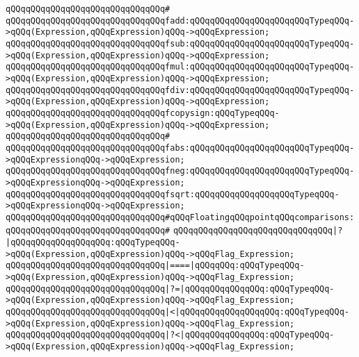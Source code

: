 \verb|qQQqqQQqqQQqqQQqqQQqqQQqqQQqqQQq#|\newline
\verb|qQQqqQQqqQQqqQQqqQQqqQQqqQQqqQQqfadd:qQQqqQQqqQQqqQQqqQQqqQQqTypeqQQq->qQQq(Expression,qQQqExpression)qQQq->qQQqExpression;|\newline
\verb|qQQqqQQqqQQqqQQqqQQqqQQqqQQqqQQqfsub:qQQqqQQqqQQqqQQqqQQqqQQqTypeqQQq->qQQq(Expression,qQQqExpression)qQQq->qQQqExpression;|\newline
\verb|qQQqqQQqqQQqqQQqqQQqqQQqqQQqqQQqfmul:qQQqqQQqqQQqqQQqqQQqqQQqTypeqQQq->qQQq(Expression,qQQqExpression)qQQq->qQQqExpression;|\newline
\verb|qQQqqQQqqQQqqQQqqQQqqQQqqQQqqQQqfdiv:qQQqqQQqqQQqqQQqqQQqqQQqTypeqQQq->qQQq(Expression,qQQqExpression)qQQq->qQQqExpression;|\newline
\verb|qQQqqQQqqQQqqQQqqQQqqQQqqQQqqQQqfcopysign:qQQqTypeqQQq->qQQq(Expression,qQQqExpression)qQQq->qQQqExpression;|\newline
\verb|qQQqqQQqqQQqqQQqqQQqqQQqqQQqqQQq#|\newline
\verb|qQQqqQQqqQQqqQQqqQQqqQQqqQQqqQQqfabs:qQQqqQQqqQQqqQQqqQQqqQQqTypeqQQq->qQQqExpressionqQQq->qQQqExpression;|\newline
\verb|qQQqqQQqqQQqqQQqqQQqqQQqqQQqqQQqfneg:qQQqqQQqqQQqqQQqqQQqqQQqTypeqQQq->qQQqExpressionqQQq->qQQqExpression;|\newline
\verb|qQQqqQQqqQQqqQQqqQQqqQQqqQQqqQQqfsqrt:qQQqqQQqqQQqqQQqqQQqTypeqQQq->qQQqExpressionqQQq->qQQqExpression;|\newline
\newline
\verb|qQQqqQQqqQQqqQQqqQQqqQQqqQQqqQQq#qQQqFloatingqQQqpointqQQqcomparisons:|\newline
\verb|qQQqqQQqqQQqqQQqqQQqqQQqqQQqqQQq#|\newline
\verb|qQQqqQQqqQQqqQQqqQQqqQQqqQQqqQQq|\verb#|?|qQQqqQQqqQQqqQQqqQQq:qQQqTypeqQQq->qQQq(Expression,qQQqExpression)qQQq->qQQqFlag_Expression;#\newline
\verb|qQQqqQQqqQQqqQQqqQQqqQQqqQQqqQQq|\verb#|====|qQQqqQQq:qQQqTypeqQQq->qQQq(Expression,qQQqExpression)qQQq->qQQqFlag_Expression;#\newline
\verb|qQQqqQQqqQQqqQQqqQQqqQQqqQQqqQQq|\verb#|?=|qQQqqQQqqQQqqQQq:qQQqTypeqQQq->qQQq(Expression,qQQqExpression)qQQq->qQQqFlag_Expression;#\newline
\verb|qQQqqQQqqQQqqQQqqQQqqQQqqQQqqQQq|\verb#|<|qQQqqQQqqQQqqQQqqQQq:qQQqTypeqQQq->qQQq(Expression,qQQqExpression)qQQq->qQQqFlag_Expression;#\newline
\verb|qQQqqQQqqQQqqQQqqQQqqQQqqQQqqQQq|\verb#|?<|qQQqqQQqqQQqqQQq:qQQqTypeqQQq->qQQq(Expression,qQQqExpression)qQQq->qQQqFlag_Expression;#\newline
